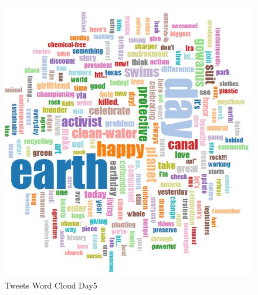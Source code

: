 \begin{figure}[ht]
	\begin{center}
		 \includegraphics[scale=0.90]{wordcloudday5}
		  \caption{Tweets Word Cloud Day5}
	 \end{center}
\end{figure}

\newpage
